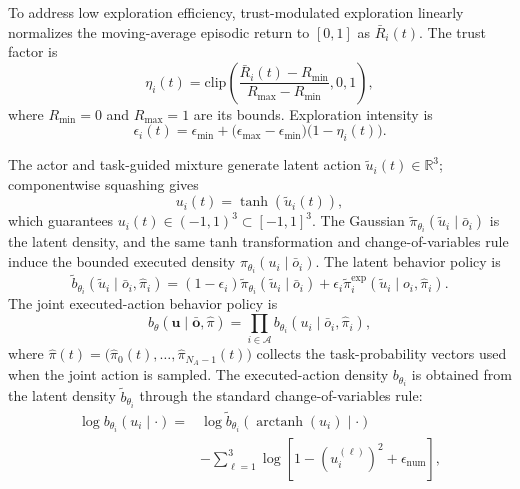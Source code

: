 \documentclass[unbranded]{cja}
\begin{document}
To address low exploration efficiency, trust-modulated exploration linearly normalizes the moving-average episodic return to $[0,1]$ as $\bar R_i(t)$. The trust factor is
\begin{equation}
\eta_i(t)
=
\mathrm{clip}
\left(
\frac{\bar R_i(t)-R_{\min}}{R_{\max}-R_{\min}},
0,1
\right),
\end{equation}
where $R_{\min}=0$ and $R_{\max}=1$ are its bounds. Exploration intensity is
\begin{equation}
\epsilon_i(t)
=
\epsilon_{\min}
+
\bigl(\epsilon_{\max}-\epsilon_{\min}\bigr)
\bigl(1-\eta_i(t)\bigr).
\end{equation}

The actor and task-guided mixture generate latent action $\widetilde u_i(t)\in\mathbb R^3$; componentwise squashing gives
\begin{equation}
u_i(t)
=
\tanh\!\left(\widetilde u_i(t)\right),
\end{equation}
which guarantees $u_i(t)\in(-1,1)^3\subset[-1,1]^3$. The Gaussian $\widetilde\pi_{\theta_i}(\widetilde u_i\mid\bar o_i)$ is the latent density, and the same tanh transformation and change-of-variables rule induce the bounded executed density $\pi_{\theta_i}(u_i\mid\bar o_i)$. The latent behavior policy is
\begin{equation}
\widetilde b_{\theta_i}(\widetilde u_i\mid\bar o_i,\hat{\pi}_i)
=
(1-\epsilon_i)\widetilde\pi_{\theta_i}(\widetilde u_i\mid\bar o_i)
+\epsilon_i\widetilde\pi_i^{\mathrm{exp}}(\widetilde u_i\mid o_i,\hat{\pi}_i).
\end{equation}
The joint executed-action behavior policy is
\begin{equation}
b_\theta(\mathbf u\mid\bar{\mathbf o},\hat{\pi})
=
\prod_{i\in\mathcal A}b_{\theta_i}(u_i\mid\bar o_i,\hat{\pi}_i),
\end{equation}
where $\hat{\pi}(t)=\bigl(\hat{\pi}_0(t),\ldots,\hat{\pi}_{N_A-1}(t)\bigr)$ collects the task-probability vectors used when the joint action is sampled. The executed-action density $b_{\theta_i}$ is obtained from the latent density $\widetilde b_{\theta_i}$ through the standard change-of-variables rule:
\begin{equation}
\begin{aligned}
\log b_{\theta_i}(u_i\mid\cdot)
= {}&
\log
\widetilde b_{\theta_i}
\left(
\operatorname{arctanh}(u_i)\mid\cdot
\right)
\\
&-
\sum_{\ell=1}^{3}
\log
\left[
1-\left(u_i^{(\ell)}\right)^2+\epsilon_{\mathrm{num}}
\right],
\end{aligned}
\end{equation}
\end{document}
